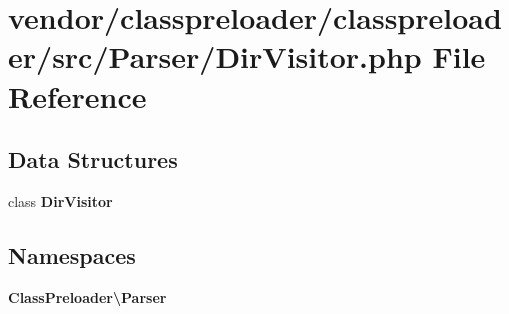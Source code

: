 \section{vendor/classpreloader/classpreloader/src/\+Parser/\+Dir\+Visitor.php File Reference}
\label{_dir_visitor_8php}
\subsection*{Data Structures}
\begin{DoxyCompactItemize}
\item 
class {\bf Dir\+Visitor}
\end{DoxyCompactItemize}
\subsection*{Namespaces}
\begin{DoxyCompactItemize}
\item 
 {\bf Class\+Preloader\textbackslash{}\+Parser}
\end{DoxyCompactItemize}
